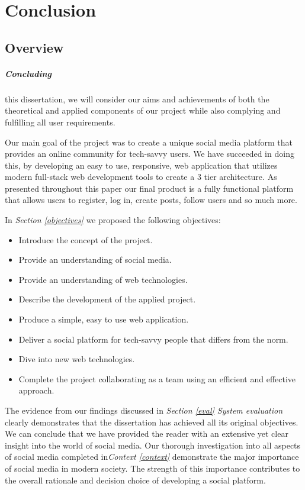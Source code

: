 
\chapter{Conclusion}
\section{Overview}
\paragraph{Concluding} this dissertation, we will consider our aims and achievements of both the theoretical and applied components of our project while also complying and fulfilling all user requirements. 

Our main goal of the project was to create a unique social media platform that provides an online community for tech-savvy users. We have succeeded in doing this, by developing an easy to use, responsive, web application that utilizes modern full-stack web development tools to create a 3 tier architecture. As presented throughout this paper our final product is a fully functional platform that allows users to register, log in, create posts, follow users and so much more.

In \textit{Section \ref{objectives}} we proposed the following objectives:
\begin{itemize}
    \item Introduce the concept of the project.
    \item Provide an understanding of social media.
    \item Provide an understanding of web technologies.
    \item Describe the development of the applied project.
    \item Produce a simple, easy to use web application.
    \item Deliver a social platform for tech-savvy people that differs from the norm.
    \item Dive into new web technologies.
    \item Complete the project collaborating as a team using an efficient and effective approach.  
\end{itemize}

The evidence from our findings discussed in \textit{Section \ref{eval} System evaluation} clearly demonstrates that the dissertation has achieved all its original objectives. We can conclude that we have provided the reader with an extensive yet clear insight into the world of social media. Our thorough investigation into all aspects of social media completed in\textit{Context \ref{context}} demonstrate the major importance of social media in modern society. The strength of this importance contributes to the overall rationale and decision choice of developing a social platform. 

